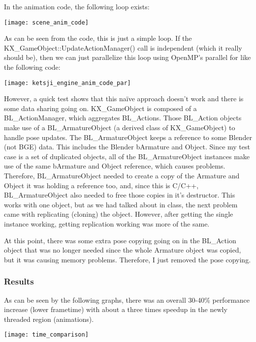 \documentclass[10pt]{article}
\begin{document}
In the animation code, the following loop exists:

\medskip
\begin{center}
\texttt{[image: scene\_anim\_code]}
\end{center}

As can be seen from the code, this is just a simple loop. If the KX\_GameObject::UpdateActionManager() call is independent (which it really should be), then we can just parallelize this loop using OpenMP's parallel for like the following code:

\medskip
\begin{center}
\texttt{[image: ketsji\_engine\_anim\_code\_par]}
\end{center}


However, a quick test shows that this naïve approach doesn't work and there is some data sharing going on. KX\_GameObject is composed of a BL\_ActionManager, which aggregates BL\_Actions. Those BL\_Action objects make use of a BL\_ArmatureObject (a derived class of KX\_GameObject) to handle pose updates. The BL\_ArmatureObject keeps a reference to some Blender (not BGE) data. This includes the Blender bArmature and Object. Since my test case is a set of duplicated objects, all of the BL\_ArmatureObject instances make use of the same bArmature and Object reference, which causes problems. Therefore, BL\_ArmatureObject needed to create a copy of the Armature and Object it was holding a reference too, and, since this is C/C++, BL\_ArmatureObject also needed to free those copies in it's destructor. This works with one object, but as we had talked about in class, the next problem came with replicating (cloning) the object. However, after getting the single instance working, getting replication working was more of the same.

At this point, there was some extra pose copying going on in the BL\_Action object that was no longer needed since the whole Armature object was copied, but it was causing memory problems. Therefore, I just removed the pose copying.

\subsubsection{Results}
As can be seen by the following graphs, there was an overall 30-40\% performance increase (lower frametime) with about a three times speedup in the newly threaded region (animations).

\medskip
\begin{center}
\texttt{[image: time\_comparison]}
\end{center}
\end{document}

